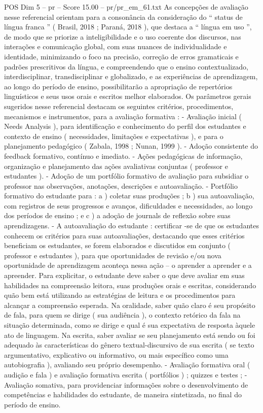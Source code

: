 \begin{textsample}{POS Dim 5 – pr – Score 15.00 – pr/pr\_em\_61.txt}
As concepções de avaliação nesse referencial orientam para a consonância da consideração do “ status de língua franca ” ( Brasil, 2018 ; Paraná, 2018 ), que destaca a “ língua em uso ”, de modo que se priorize a inteligibilidade e o uso coerente dos discursos, nas interações e comunicação global, com suas nuances de individualidade e identidade, minimizando o foco na precisão, correção de erros gramaticais e padrões prescritivos da língua, e compreendendo que o ensino contextualizado, interdisciplinar, transdisciplinar e globalizado, e as experiências de aprendizagem, ao longo do período de ensino, possibilitarão a apropriação de repertórios linguísticos e seus usos orais e escritos melhor elaborados.
Os parâmetros gerais sugeridos nesse referencial destacam os seguintes critérios, procedimentos, mecanismos e instrumentos, para a avaliação formativa : - Avaliação inicial ( Needs Analysis ), para identificação e conhecimento do perfil dos estudantes e contexto de ensino ( necessidades, limitações e expectativas ), e para o planejamento pedagógico ( Zabala, 1998 ; Nunan, 1999 ). - Adoção consistente do feedback formativo, contínuo e imediato. - Ações pedagógicas de informação, organização e planejamento das ações avaliativas conjuntas ( professor e estudantes ). - Adoção de um portfólio formativo de avaliação para subsidiar o professor nas observações, anotações, descrições e autoavaliação. - Portfólio formativo do estudante para : a ) coletar suas produções ; b ) sua autoavaliação, com registros de seus progressos e avanços, dificuldades e necessidades, ao longo dos períodos de ensino ; e c ) a adoção de journals de reflexão sobre suas aprendizagens. - A autoavaliação do estudante : certificar -se de que os estudantes conhecem os critérios para suas autoavaliações, destacando que esses critérios beneficiam os estudantes, se forem elaborados e discutidos em conjunto ( professor e estudantes ), para que oportunidades de revisão e/ou nova oportunidade de aprendizagem aconteça nessa ação – o aprender a aprender e a apreender.
Para explicitar, o estudante deve saber o que deve avaliar em suas habilidades na compreensão leitora, suas produções orais e escritas, considerando quão bem está utilizando as estratégias de leitura e os procedimentos para alcançar a compreensão esperada.
Na oralidade, saber quão claro é seu propósito de fala, para quem se dirige ( sua audiência ), o contexto retórico da fala na situação determinada, como se dirige e qual é sua expectativa de resposta àquele ato de linguagem.
Na escrita, saber avaliar se seu planejamento está sendo ou foi adequado às características do gênero textual-discursivo de sua escrita ( se texto argumentativo, explicativo ou informativo, ou mais específico como uma autobiografia ), avaliando seu próprio desempenho. - Avaliação formativa oral ( audição e fala ) e avaliação formativa escrita ( portfólios ) ; quizzes e testes ; - Avaliação somativa, para providenciar informações sobre o desenvolvimento de competências e habilidades do estudante, de maneira sintetizada, no final do período de ensino.

\end{textsample}
